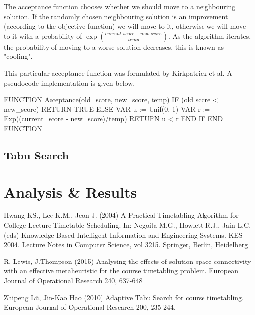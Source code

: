 \documentclass[12pt]{article}
\theoremstyle{definition}
\theoremstyle{plain}
\begin{document}
The acceptance function chooses whether we should move to a neighbouring solution. If the randomly chosen neighbouring solution is an improvement (according to the objective function) we will move to it, otherwise we will move to it with a probability of $\exp(\frac{current\_score - new\_score}{temp})$. As the algorithm iterates, the probability of moving to a worse solution decreases, this is known as "cooling".

This particular acceptance function was formulated by Kirkpatrick et al. A pseudocode implementation is given below.

\begin{pseudo}
	FUNCTION Acceptance(old_score, new_score, temp)
		IF (old score < new_score) RETURN TRUE
		ELSE 
			VAR u := Unif(0, 1)
			VAR r := Exp((current_score - new_score)/temp)
			RETURN u < r
		END IF
	END FUNCTION
\end{pseudo}

\subsection{Tabu Search}

\section{Analysis \& Results}

\newpage

\begin{thebibliography}{9}
	Hwang KS., Lee K.M., Jeon J. (2004) A Practical Timetabling Algorithm for College Lecture-Timetable Scheduling. In: Negoita M.G., Howlett R.J., Jain L.C. (eds) Knowledge-Based Intelligent Information and Engineering Systems. KES 2004. Lecture Notes in Computer Science, vol 3215. Springer, Berlin, Heidelberg
	
	R. Lewis, J.Thompson (2015) Analysing the effects of solution space connectivity with an effective metaheuristic for the course timetabling problem. European Journal of Operational Research 240, 637-648
	
	Zhipeng L\" u, Jin-Kao Hao (2010) Adaptive Tabu Search for course timetabling. European Journal of Operational Research 200, 235-244.
\end{thebibliography}
\end{document}
